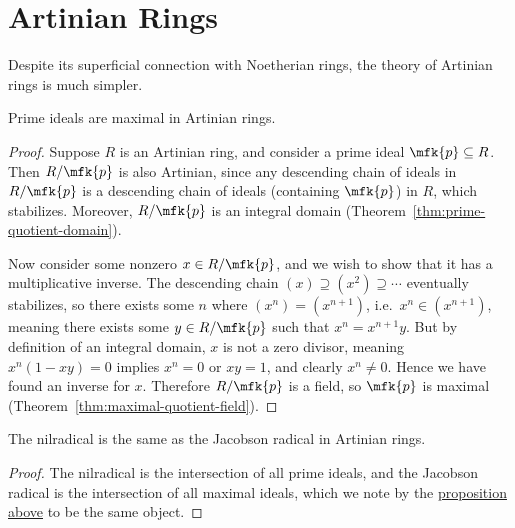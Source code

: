 \section{Artinian Rings}

\begin{remark}
    Despite its superficial connection with Noetherian rings,
    the theory of Artinian rings is much simpler.
\end{remark}

\begin{proposition}\label{prop:artinian-prime-maximal}
    Prime ideals are maximal in Artinian rings.
\end{proposition}
\begin{proof}
    Suppose \(R\) is an Artinian ring, and consider a prime ideal \(\mfk{p} \subseteq R\).
    Then \(R/\mfk{p}\) is also Artinian,
    since any descending chain of ideals in \(R/\mfk{p}\)
    is a descending chain of ideals (containing \(\mfk{p}\)) in \(R\),
    which stabilizes.
    Moreover, \(R/\mfk{p}\) is an integral domain (Theorem~\ref{thm:prime-quotient-domain}).

    Now consider some nonzero \(x \in R/\mfk{p}\), and we wish to show that it has a multiplicative inverse.
    The descending chain \((x) \supseteq (x^2) \supseteq \cdots\) eventually stabilizes,
    so there exists some \(n\) where \((x^n) = (x^{n+1})\),
    i.e.\ \(x^n \in (x^{n+1})\), meaning there exists some \(y \in R/\mfk{p}\) such that \(x^n = x^{n+1}y\).
    But by definition of an integral domain,
    \(x\) is not a zero divisor, meaning \(x^n(1-xy) = 0\) implies \(x^n = 0\) or \(xy = 1\),
    and clearly \(x^n \neq 0\).
    Hence we have found an inverse for \(x\).
    Therefore \(R/\mfk{p}\) is a field,
    so \(\mfk{p}\) is maximal (Theorem~\ref{thm:maximal-quotient-field}).
\end{proof}
\begin{corollary}
    The nilradical is the same as the Jacobson radical in Artinian rings.
\end{corollary}
\begin{proof}
    The nilradical is the intersection of all prime ideals,
    and the Jacobson radical is the intersection of all maximal ideals,
    which we note by the \hyperref[prop:artinian-prime-maximal]{proposition above}
    to be the same object.
\end{proof}

